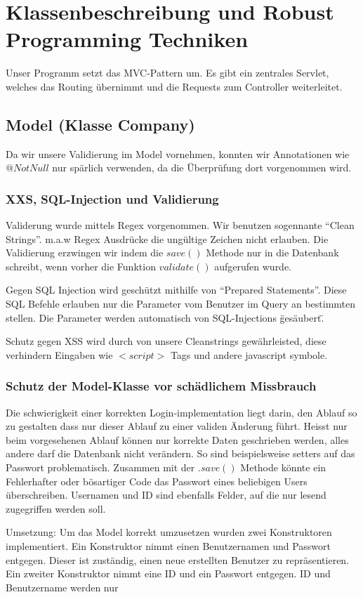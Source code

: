 \documentclass[10pt]{scrartcl}
\begin{document}
\section{Klassenbeschreibung und Robust Programming Techniken}
Unser Programm setzt das MVC-Pattern um. Es gibt ein zentrales Servlet, welches das Routing übernimmt und die Requests zum Controller weiterleitet.

\subsection{Model (Klasse Company)}
Da wir unsere Validierung im Model vornehmen, konnten wir Annotationen wie $@NotNull$ nur spärlich verwenden, da die Überprüfung dort vorgenommen wird.
\subsubsection{XXS, SQL-Injection und Validierung}
Validerung wurde mittels Regex vorgenommen. Wir benutzen sogennante ``Clean Strings''. m.a.w Regex Ausdrücke die ungültige Zeichen nicht erlauben. Die Validierung erzwingen wir indem die $save()$ Methode nur in die Datenbank schreibt, wenn vorher die Funktion $validate()$ aufgerufen wurde.

Gegen SQL Injection wird geschützt mithilfe von ``Prepared Statements''. Diese SQL Befehle erlauben nur die Parameter 
vom Benutzer im Query an bestimmten stellen. Die Parameter werden automatisch von SQL-Injections \"gesäubert\".
 
Schutz gegen XSS wird durch von unsere Cleanstrings gewährleisted, diese verhindern Eingaben wie $<script>$ Tags und andere javascript symbole.

\subsubsection{Schutz der Model-Klasse vor schädlichem Missbrauch}
Die schwierigkeit einer korrekten Login-implementation liegt darin, den Ablauf so zu gestalten dass nur dieser Ablauf zu einer validen Änderung führt. Heisst nur beim vorgesehenen Ablauf können nur korrekte Daten geschrieben werden, alles andere darf die Datenbank nicht verändern. So sind beispielsweise setters auf das Passwort problematisch. Zusammen mit der $.save()$ Methode könnte ein Fehlerhafter oder bösartiger Code das Passwort eines beliebigen Users überschreiben. Usernamen und ID sind ebenfalls Felder, auf die nur lesend zugegriffen werden soll.

Umsetzung:
Um das Model korrekt umzusetzen wurden zwei Konstruktoren implementiert. Ein Konstruktor nimmt einen Benutzernamen und Passwort entgegen. Dieser ist zuständig, einen neue erstellten Benutzer zu repräsentieren. Ein zweiter Konstruktor nimmt eine ID und ein Passwort entgegen. ID und Benutzername werden nur 
\end{document}
